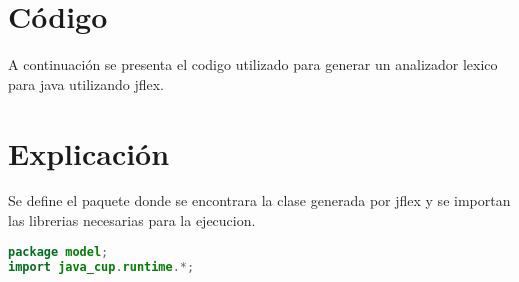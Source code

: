 \documentclass[10pt]{article}
\begin{document}
    
    \newpage

    \tableofcontents
    \newpage

    \section{C\'odigo}
    A continuaci\'on se presenta el codigo utilizado para generar un analizador lexico para java utilizando jflex.
    
    
    \section{Explicaci\'on}
    Se define el paquete donde se encontrara la clase generada por jflex y se importan las librerias necesarias para la ejecucion.
    \begin{lstlisting}[language=Java,label={lst:lexer-package}]
package model;
import java_cup.runtime.*;
    \end{lstlisting}
\end{document}
